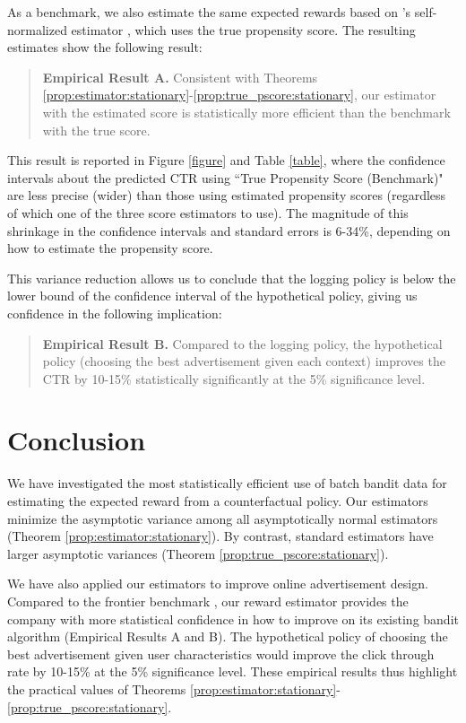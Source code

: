 \documentclass[letterpaper]{article} \usepackage{aaai19}  \usepackage{times}  \usepackage{helvet}  \usepackage{courier}  \usepackage{url}  \usepackage{graphicx}  \frenchspacing  \usepackage{comment}
\newcommand{\citet}[1]
{\citeauthor{#1} \shortcite{#1}}
\begin{document}
As a benchmark, we also estimate the same expected rewards based on \citet{Swaminathan2015b}'s self-normalized estimator , which uses the true propensity score. 
The resulting estimates show the following result: 

\begin{quote}
	\textbf{Empirical Result A.} Consistent with Theorems \ref{prop:estimator:stationary}-\ref{prop:true_pscore:stationary}, our estimator  with the estimated score is statistically more efficient than the benchmark  with the true score. 
\end{quote}

This result is reported in Figure \ref{figure} and Table \ref{table}, where the confidence intervals about the predicted CTR using ``True Propensity Score (Benchmark)" are less precise (wider) than those using estimated propensity scores (regardless of which one of the three score estimators to use). 
The magnitude of this shrinkage in the confidence intervals and standard errors is 6-34\%, depending on how to estimate the propensity score. 

This variance reduction allows us to conclude that the logging policy is below the lower bound of the confidence interval of the hypothetical policy, giving us confidence in the following implication: 

\begin{quote}
	\textbf{Empirical Result B.} Compared to the logging policy, the hypothetical policy (choosing the best advertisement given each context) improves the CTR by 10-15\% statistically significantly at the 5\% significance level. 
\end{quote}

\section{Conclusion} 

We have investigated the most statistically efficient use of batch bandit data for estimating the expected reward from a counterfactual policy. 
Our estimators minimize the asymptotic variance among all asymptotically normal estimators (Theorem \ref{prop:estimator:stationary}). 
By contrast, standard estimators have larger asymptotic variances (Theorem \ref{prop:true_pscore:stationary}). 

We have also applied our estimators to improve online advertisement design. 
Compared to the frontier benchmark , our reward estimator  provides the company with more statistical confidence in how to improve on its existing bandit algorithm (Empirical Results A and B). 
The hypothetical policy of choosing the best advertisement given user characteristics would improve the click through rate by 10-15\% at the 5\% significance level. 
These empirical results thus highlight the practical values of Theorems \ref{prop:estimator:stationary}-\ref{prop:true_pscore:stationary}. \\
\end{document}
